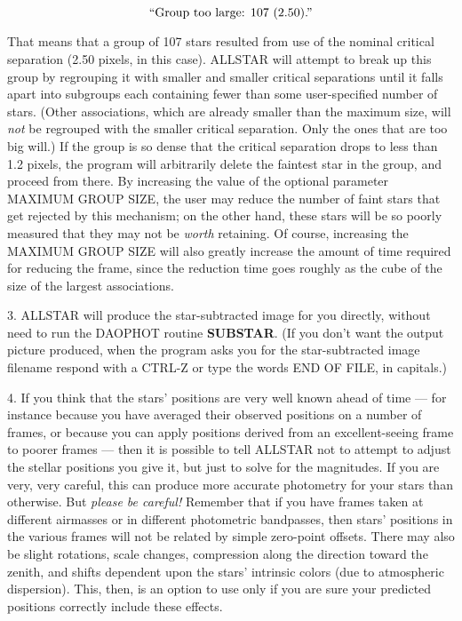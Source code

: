 $$\hbox{\rm ``Group too large:  107 (2.50).''}$$ 

\item{} That means that a group of 107 stars resulted from use of the
nominal critical separation (2.50 pixels, in this case).  ALLSTAR will
attempt to break up this group by regrouping it with smaller and
smaller critical separations until it falls apart into subgroups each
containing fewer than some user-specified number of stars.  (Other
associations, which are already smaller than the maximum size, will
{\it not\/} be regrouped with the smaller critical separation.  Only
the ones that are too big will.)  If the group is so dense that the
critical separation drops to less than 1.2 pixels, the program will
arbitrarily delete the faintest star in the group, and proceed from
there.  By increasing the value of the optional parameter MAXIMUM GROUP
SIZE, the user may reduce the number of faint stars that get rejected
by this mechanism; on the other hand, these stars will be so poorly
measured that they may not be {\it worth\/} retaining.  Of course,
increasing the MAXIMUM GROUP SIZE will also greatly increase the amount
of time required for reducing the frame, since the reduction time goes
roughly as the cube of the size of the largest associations.

\item{3.} ALLSTAR will produce the star-subtracted image for you
directly, without need to run the DAOPHOT routine {\bf SUBSTAR}.  (If
you don't want the output picture produced, when the program asks you
for the star-subtracted image filename respond with a CTRL-Z or type
the words END OF FILE, in capitals.)

\item{4.} If you think that the stars' positions are very well known
ahead of time --- for instance because you have averaged their observed
positions on a number of frames, or because you can apply positions
derived from an excellent-seeing frame to poorer frames --- then it is
possible to tell ALLSTAR not to attempt to adjust the stellar
positions you give it, but just to solve for the magnitudes.  If you
are very, very careful, this can produce more accurate photometry for
your stars than otherwise.  But {\it please be careful!\/} Remember
that if you have frames taken at different airmasses or in different
photometric bandpasses, then stars' positions in the various frames
will not be related by simple zero-point offsets.  There may also be
slight rotations, scale changes, compression along the direction toward
the zenith, and shifts dependent upon the stars' intrinsic colors (due
to atmospheric dispersion). This, then, is an option to use only if you
are sure your predicted positions correctly include these effects.

